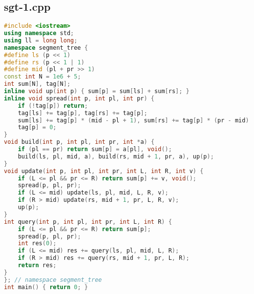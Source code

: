 \documentclass[9pt, a4paper, oneside]{book}
\begin{document}
\subsection{sgt-1.cpp}
\begin{lstlisting}[language={C++}]
#include <iostream>
using namespace std;
using ll = long long;
namespace segment_tree {
#define ls (p << 1)
#define rs (p << 1 | 1)
#define mid (pl + pr >> 1)
const int N = 1e6 + 5;
int sum[N], tag[N];
inline void up(int p) { sum[p] = sum[ls] + sum[rs]; }
inline void spread(int p, int pl, int pr) {
    if (!tag[p]) return;
    tag[ls] += tag[p], tag[rs] += tag[p];
    sum[ls] += tag[p] * (mid - pl + 1), sum[rs] += tag[p] * (pr - mid);
    tag[p] = 0;
}
void build(int p, int pl, int pr, int *a) {
    if (pl == pr) return sum[p] = a[pl], void();
    build(ls, pl, mid, a), build(rs, mid + 1, pr, a), up(p);
}
void update(int p, int pl, int pr, int L, int R, int v) {
    if (L <= pl && pr <= R) return sum[p] += v, void();
    spread(p, pl, pr);
    if (L <= mid) update(ls, pl, mid, L, R, v);
    if (R > mid) update(rs, mid + 1, pr, L, R, v);
    up(p);
}
int query(int p, int pl, int pr, int L, int R) {
    if (L <= pl && pr <= R) return sum[p];
    spread(p, pl, pr);
    int res(0);
    if (L <= mid) res += query(ls, pl, mid, L, R);
    if (R > mid) res += query(rs, mid + 1, pr, L, R);
    return res;
}
}; // namespace segment_tree
int main() { return 0; }\end{lstlisting}
\end{document}
